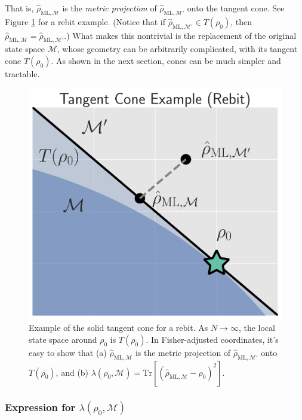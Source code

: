 \documentclass[aps,pra, twocolumn]{revtex4-1}
\newcommand{\M}{\mathcal{M}}
\newcommand{\rhohat}{\hat{\rho}}
\newcommand{\rhoML}[1]{\rhohat_{\scriptscriptstyle{\mathrm{ML},#1}}}
\begin{document}
That is, $\rhoML{\M}$ is the \emph{metric projection} of $\rhoML{\M'}$ onto the tangent cone. See Figure \ref{fig:tangentcone} for a rebit example. (Notice that if $\rhoML{\M'} \in T(\rho_{0})$, then $\rhoML{\M} = \rhoML{\M'}$.) What makes this  nontrivial is the replacement of the original state space $\M$, whose geometry can be arbitrarily complicated, with its tangent cone $T(\rho_{0})$. As shown in the next section, cones can be much simpler and tractable.

\begin{figure}
\includegraphics[width=.75\columnwidth]{Images/Figure_4.pdf}
 \caption{Example of the solid tangent cone for a rebit. As $N \rightarrow \infty$, the local state space around $\rho_{0}$ is $T(\rho_{0})$. In Fisher-adjusted coordinates, it's easy to show that (a) $\rhoML{\M}$ is the metric projection of $\rhoML{\M'}$ onto $T(\rho_{0})$, and (b) $\lambda(\rho_{0}, \M) = \mathrm{Tr}[(\rhoML{\M} - \rho_{0})^{2}]$.}
\label{fig:tangentcone}
\end{figure}

\subsubsection{Expression for $\lambda(\rho_{0}, \M)$}
\end{document}
